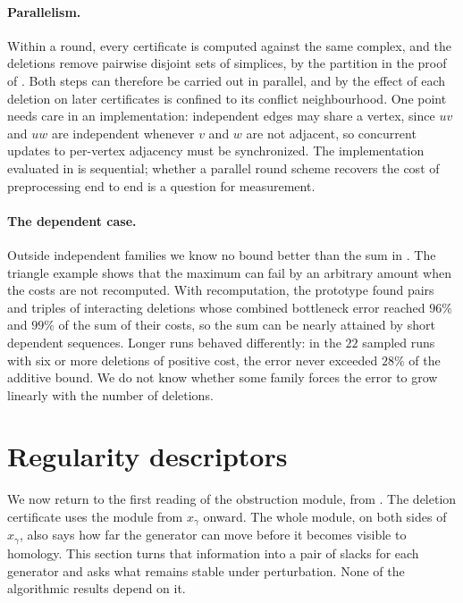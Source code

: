 \documentclass[11pt,letterpaper]{article}
\theoremstyle{definition}
\begin{document}
\paragraph{Parallelism.}
Within a round, every certificate is computed against the same complex, and
the deletions remove pairwise disjoint sets of simplices, by the partition in
the proof of . Both steps can therefore be carried out in
parallel, and by  the effect of each deletion on later
certificates is confined to its conflict neighbourhood. One point needs care
in an implementation: independent edges may share a vertex, since $uv$ and
$uw$ are independent whenever $v$ and $w$ are not adjacent, so concurrent
updates to per-vertex adjacency must be synchronized. The implementation
evaluated in  is sequential; whether a parallel round
scheme recovers the cost of preprocessing end to end is a question for
measurement.

\paragraph{The dependent case.}
Outside independent families we know no bound better than the sum in
. The triangle example shows that the maximum
can fail by an arbitrary amount when the costs are not recomputed. With
recomputation, the prototype found pairs and triples of interacting deletions
whose combined bottleneck error reached $96\%$ and $99\%$ of the sum of their
costs, so the sum can be nearly attained by short dependent sequences. Longer
runs behaved differently: in the $22$ sampled runs with six or more deletions
of positive cost, the error never exceeded $28\%$ of the additive bound. We do
not know whether some family forces the error to grow linearly with the number
of deletions.

\section{Regularity descriptors}
\label{sec:diagrams}

We now return to the first reading of the obstruction module, from
. The deletion certificate uses the module from
$x_\gamma$ onward. The whole module, on both sides of $x_\gamma$, also says
how far the generator can move before it becomes visible to homology. This
section turns that information into a pair of slacks for each generator and
asks what remains stable under perturbation. None of the algorithmic results
depend on it.
\end{document}
